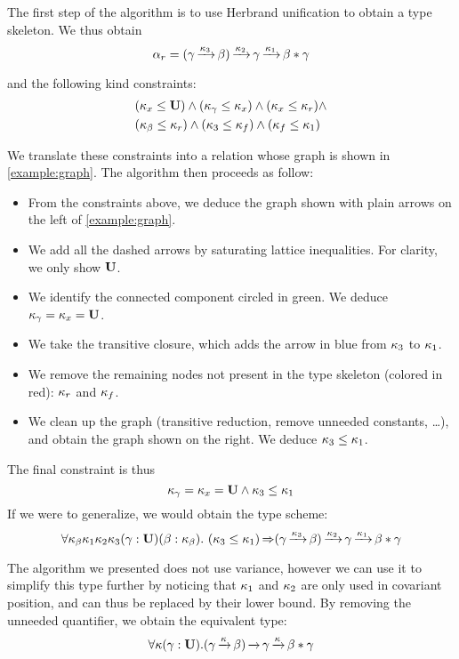 The first step of the algorithm is to use Herbrand unification to obtain
a type skeleton. We thus obtain
$$\alpha_r =
(\gamma \operatorname{\xrightarrow{\kappa_3}} \beta) \operatorname{\xrightarrow{\kappa_2}} \gamma \operatorname{\xrightarrow{\kappa_1}} \beta * \gamma$$

and the following kind constraints: 
\[\begin{aligned}
    &(\kappa_x \leq \mathbf{U})
    \wedge
    (\kappa_\gamma \leq \kappa_x)
    \wedge
    (\kappa_x \leq \kappa_r)
    \wedge\\
    &(\kappa_\beta \leq \kappa_r)
    \wedge
    (\kappa_3 \leq \kappa_f)
    \wedge
    (\kappa_f \leq \kappa_1)
\end{aligned}\]

We translate these constraints into a relation whose graph
is shown in \cref{example:graph}.
%
The algorithm then proceeds as follow:
\begin{itemize}[noitemsep]
\item From the constraints above, we deduce the graph shown
  with plain arrows on the left of \cref{example:graph}.
\item We add all the dashed arrows by saturating
  lattice inequalities. For clarity, we only show $\mathbf{U}$.
\item We identify the connected component circled in
  {\color{green} green}.
  We deduce $\kappa_\gamma = \kappa_x = \mathbf{U}$.
\item We take the transitive closure, which adds the
  arrow in {\color{blue} blue} from $\kappa_3$ to $\kappa_1$.
\item We remove the remaining nodes not present in the type skeleton (colored in {\color{red} red}): $\kappa_r$ and $\kappa_f$.
\item We clean up the graph (transitive reduction, remove unneeded constants, \dots),
  and obtain the graph shown on the right.
  We deduce $\kappa_3 \leq \kappa_1$.
\end{itemize}

The final constraint is thus
$$\kappa_\gamma = \kappa_x = \mathbf{U} \wedge \kappa_3 \leq \kappa_1$$
If we were to generalize, we would obtain the type scheme:
$$\forall \kvar_\beta \kvar_1 \kvar_2 \kvar_3
(\gamma : \kun) (\beta : \kvar_\beta).\ %
\qual
{\Cleq{\kvar_3}{\kvar_1}}
{(\gamma \tarr{\kvar_3} \beta) \tarr{\kvar_2} \gamma \tarr{\kvar_1} \beta * \gamma}$$

The algorithm we presented does not use variance, however we can use it to
simplify this type further by noticing that $\kappa_1$ and $\kappa_2$ are only
used in covariant position, and can thus be replaced by their lower bound.
By removing the unneeded quantifier, we obtain the equivalent type:
$$
\forall \kappa
(\gamma : \mathbf{U}).
{(\gamma \operatorname{\xrightarrow{\kappa}} \beta) \operatorname{\xrightarrow{}} \gamma \operatorname{\xrightarrow{\kappa}} \beta * \gamma}$$



